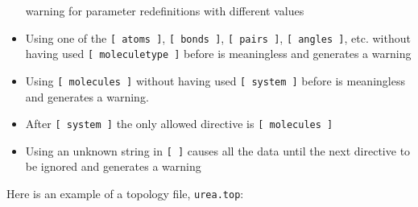 \begin{itemize}
      warning for parameter redefinitions with different values
\item Using one of the {\tt [~atoms~]}, {\tt [~bonds~]},
      {\tt [~pairs~]}, {\tt [~angles~]}, etc. without having used
      {\tt [~moleculetype~]}
      before is meaningless and generates a warning
\item Using {\tt [~molecules~]} without having used
      {\tt [~system~]} before is meaningless and generates a warning.
\item After {\tt [~system~]} the only allowed directive is {\tt [~molecules~]}
\item Using an unknown string in {\tt [ ]} causes all the data until
      the next directive to be ignored and generates a warning
\end{itemize}

Here is an example of a topology file, {\tt urea.top}:

